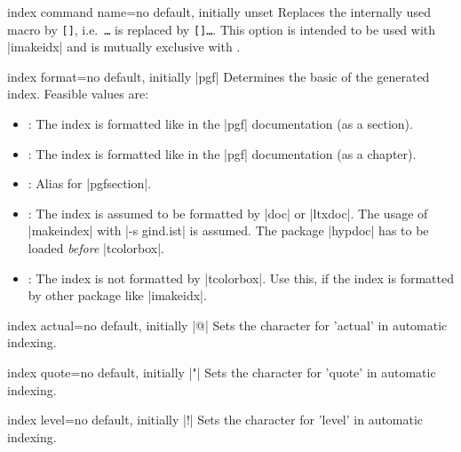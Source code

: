 \begin{docTcbKey}[][doc new=2015-01-09]{index command name}{=}{no default, initially unset}
  Replaces the internally used  macro by
  \mbox{\texttt{[]}}, i.e.\ 
  \mbox{\texttt{\textbraceleft\ldots\textbraceright}} is replaced by
  \mbox{\cs{index}\texttt{[\meta{name}]\textbraceleft\ldots\textbraceright}}.
  This option is intended to be used with |imakeidx| and is
  mutually exclusive with .
\begin{dispListing}
\end{dispListing}
\end{docTcbKey}



\begin{docTcbKey}{index format}{=}{no default, initially |pgf|}
  Determines the basic \meta{format} of the generated index.
  Feasible values are:
  \begin{itemize}
  \item{}: The index is formatted like in the |pgf| documentation (as a section).
  \item\docValue{pgfchapter}: The index is formatted like in the |pgf| documentation (as a chapter).
  \item\docValue{pgf}: Alias for |pgfsection|.
  \item{}: The index is assumed to be formatted by |doc| or |ltxdoc|. The usage of |makeindex|
    with |-s gind.ist| is assumed. The package |hypdoc| has to be loaded
    \emph{before} |tcolorbox|.
  \item{}: The index is not formatted by |tcolorbox|. Use this, if
    the index is formatted by other package like |imakeidx|.
  \end{itemize}
\end{docTcbKey}


\begin{docTcbKey}{index actual}{=}{no default, initially |@|}
  Sets the character for 'actual' in automatic indexing.
\end{docTcbKey}

\begin{docTcbKey}{index quote}{=}{no default, initially |"|}
  Sets the character for 'quote' in automatic indexing.
\end{docTcbKey}

\begin{docTcbKey}{index level}{=}{no default, initially |!|}
  Sets the character for 'level' in automatic indexing.
\end{docTcbKey}


